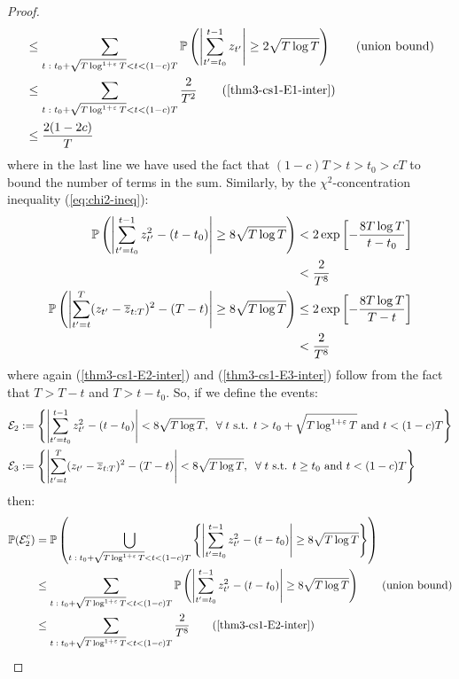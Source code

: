 \begin{proof}
\begin{align*}
    &\leq \sum_{t\;:\; t_0 + \sqrt{T\log^{1+\varepsilon}T} < t < (1-c)T} \mathbb{P}\left(\left|\sum_{t'=t_0}^{t-1} z_{t'}\right| \geq 2\sqrt{T \log T}\right) \tag{union bound}\\
    &\leq \sum_{t\;:\; t_0 + \sqrt{T\log^{1+\varepsilon}T} < t < (1-c)T} \frac{2}{T^2} \tag{\ref{thm3-cs1-E1-inter}} \\
    &\leq \frac{2(1-2c)}{T}
\end{align*}
where in the last line we have used the fact that $(1-c)T > t > t_0 > cT$ to bound the number of terms in the sum. Similarly, by the $\chi^2$-concentration inequality (\ref{eq:chi2-ineq}):
\begin{align}
    \mathbb{P}\left(\left|\sum_{t'=t_0}^{t-1} z^2_{t'} - (t -t_0)\right| \geq 8\sqrt{T \log T}\right) &< 2 \exp\left[- 
    \frac{8 T \log T}{t-t_0} \right] \notag\\
    &<  \frac{2}{T^8} \label{thm3-cs1-E2-inter}\\
    \mathbb{P}\left(\left|\sum_{t'=t}^T (z_{t'} - \overline{z}_{t:T})^2 - (T-t)\right| \geq 8\sqrt{T \log T}\right) &\leq 2 \exp\left[-\frac{8 T \log T}{T-t} \right] \notag \\
    &<  \frac{2}{T^8} \label{thm3-cs1-E3-inter}
\end{align}
where again (\ref{thm3-cs1-E2-inter}) and (\ref{thm3-cs1-E3-inter}) follow from the fact that $T > T - t$ and $T > t-t_0$. So, if we define the events:
\begin{align*}
    \mathcal{E}_2 &:= \left\{\left|\sum_{t'=t_0}^{t-1} z^2_{t'} - (t -t_0)\right| < 8\sqrt{T \log T}, \; \;\forall\; t \text{ s.t. } t > t_0 + \sqrt{T\log^{1+\varepsilon}T} \text{ and } t < (1-c)T\right\} \\
    \mathcal{E}_3 &:= \left\{\left|\sum_{t'=t}^T (z_{t'} - \overline{z}_{t:T})^2 - (T-t)\right| < 8\sqrt{T \log T}, \; \;\forall\; t \text{ s.t. } t \geq t_0 \text{ and } t < (1-c)T\right\}
\end{align*}
then:
\begin{align*}
    \mathbb{P}(\mathcal{E}^c_2) &= \mathbb{P}\left(\bigcup_{t\;:\; t_0 + \sqrt{T\log^{1+\varepsilon}T} < t < (1-c)T} \left\{\left|\sum_{t'=t_0}^{t-1} z^2_{t'} - (t -t_0)\right| \geq 8\sqrt{T \log T}\right\}\right) \\
    &\leq \sum_{t\;:\; t_0 + \sqrt{T\log^{1+\varepsilon}T} < t < (1-c)T} \mathbb{P}\left(\left|\sum_{t'=t_0}^{t-1} z^2_{t'} - (t -t_0)\right| \geq 8\sqrt{T \log T}\right) \tag{union bound}\\
    &\leq \sum_{t\;:\; t_0 + \sqrt{T\log^{1+\varepsilon}T} < t < (1-c)T} \frac{2}{T^8} \tag{\ref{thm3-cs1-E2-inter}} \\

\end{align*}
\end{proof}
